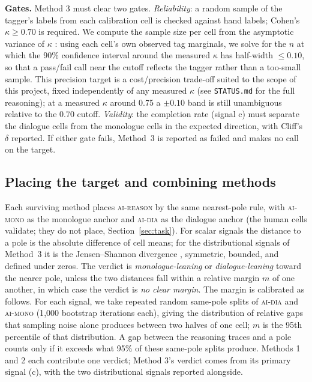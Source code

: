 \documentclass[11pt]{article}
\newcommand{\cellad}{\textsc{ai-dia}}
\newcommand{\cellam}{\textsc{ai-mono}}
\newcommand{\cellrt}{\textsc{ai-reason}}
\begin{document}
\textbf{Gates.} Method 3 must clear two gates. \emph{Reliability}: a random
sample of the tagger's labels from each calibration cell is checked against
hand labels; Cohen's $\kappa \geq 0.70$ \citep{cohen1960kappa} is required.
We compute the sample size per cell from the asymptotic variance of $\kappa$
\citep{fleiss1969kappa}: using each cell's own observed tag marginals, we solve
for the $n$ at which the 90\% confidence interval around the measured $\kappa$
has half-width $\leq 0.10$, so that a pass/fail call near the cutoff reflects
the tagger rather than a too-small sample. This precision target is a
cost/precision trade-off suited to the scope of this project, fixed
independently of any measured $\kappa$ (see \texttt{STATUS.md} for the
full reasoning); at a measured $\kappa$ around 0.75 a $\pm 0.10$ band is
still unambiguous relative to the 0.70 cutoff.
\emph{Validity}: the completion rate (signal c) must separate the dialogue
cells from the monologue cells in the expected direction, with Cliff's
$\delta$ reported. If either gate fails, Method~3 is reported as failed and
makes no call on the target.

\subsection{Placing the target and combining methods}
\label{sec:placement}

Each surviving method places \cellrt{} by the same nearest-pole rule, with
\cellam{} as the monologue anchor and \cellad{} as the dialogue anchor (the
human cells validate; they do not place, Section~\ref{sec:task}). For scalar
signals the distance to a pole is the absolute difference of cell means; for
the distributional signals of Method~3 it is the Jensen--Shannon divergence
\citep{lin1991divergence}, symmetric, bounded, and defined under zeros. The
verdict is \emph{monologue-leaning} or \emph{dialogue-leaning} toward the
nearer pole, unless the two distances fall within a relative margin $m$ of one
another, in which case the verdict is \emph{no clear margin}. The margin is
calibrated as follows. For each signal, we take repeated random same-pole
splits of \cellad{} and \cellam{} (1{,}000 bootstrap iterations each), giving
the distribution of relative gaps that sampling noise alone produces between
two halves of one cell; $m$ is the 95th percentile of that distribution. A gap
between the reasoning traces and a pole counts only if it exceeds what 95\% of
these same-pole splits produce. Methods 1 and 2 each contribute one verdict;
Method 3's verdict comes from its primary signal (c), with the two
distributional signals reported alongside.
\end{document}
